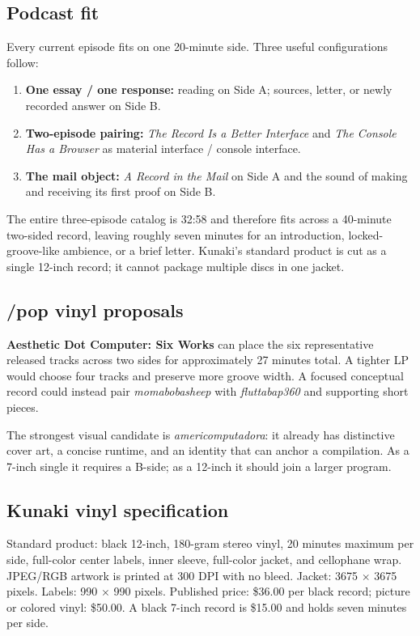 \documentclass[11pt]{article}
\begin{document}
\subsection*{Podcast fit}

Every current episode fits on one 20-minute side. Three useful configurations follow:

\begin{enumerate}
  \item \textbf{One essay / one response:} reading on Side A; sources, letter, or newly recorded answer on Side B.
  \item \textbf{Two-episode pairing:} \textit{The Record Is a Better Interface} and \textit{The Console Has a Browser} as material interface / console interface.
  \item \textbf{The mail object:} \textit{A Record in the Mail} on Side A and the sound of making and receiving its first proof on Side B.
\end{enumerate}

The entire three-episode catalog is 32:58 and therefore fits across a 40-minute two-sided record, leaving roughly seven minutes for an introduction, locked-groove-like ambience, or a brief letter. Kunaki's standard product is cut as a single 12-inch record; it cannot package multiple discs in one jacket.

\subsection*{/pop vinyl proposals}

\textbf{Aesthetic Dot Computer: Six Works} can place the six representative released tracks across two sides for approximately 27 minutes total. A tighter LP would choose four tracks and preserve more groove width. A focused conceptual record could instead pair \textit{momabobasheep} with \textit{fluttabap360} and supporting short pieces.

The strongest visual candidate is \textit{americomputadora}: it already has distinctive cover art, a concise runtime, and an identity that can anchor a compilation. As a 7-inch single it requires a B-side; as a 12-inch it should join a larger program.

\subsection*{Kunaki vinyl specification}

Standard product: black 12-inch, 180-gram stereo vinyl, 20 minutes maximum per side, full-color center labels, inner sleeve, full-color jacket, and cellophane wrap. JPEG/RGB artwork is printed at 300 DPI with no bleed. Jacket: 3675 $\times$ 3675 pixels. Labels: 990 $\times$ 990 pixels. Published price: \$36.00 per black record; picture or colored vinyl: \$50.00. A black 7-inch record is \$15.00 and holds seven minutes per side.
\end{document}
